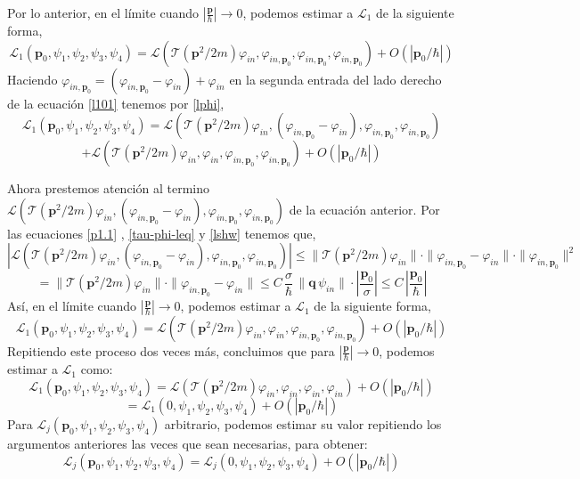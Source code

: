 \documentclass[12pt]{book}
\numberwithin{equation}{chapter}
\def\v{\mathbf}
\def\n{\noindent}
\def\T{\mathcal{T}}
\def\L{\mathcal{L}}
\def\vp{\varphi}
\def\P{\mathbf{p}}
\begin{document}
\n Por lo anterior, en el l\'imite cuando $\left| \frac{\P}{\hbar} \right| \rightarrow 0$, podemos estimar a $\L_{1}$ de la siguiente forma,
\begin{equation} \label{l101}
\L_{1}(\P_{0}, \psi_{1},\psi_{2},\psi_{3},\psi_{4})=
\L(\T (\P^{2}/2m) \vp_{in},\vp_{in,\P_{0}},\vp_{in,\P_{0}},\vp_{in,\P_{0}} )+ O \left( \left|\P_{0}/\hbar \right| \right)
\end{equation}
Haciendo $ \vp_{in,\P_{0}}= ( \vp_{in,\P_{0}} - \vp_{in} )+ \vp_{in} $ en la segunda entrada del lado derecho de la ecuaci\'on \eqref{l101} tenemos por \eqref{lphi},
$$\L_{1}(\P_{0}, \psi_{1},\psi_{2},\psi_{3},\psi_{4})= \L(\T (\P^{2}/2m) \vp_{in},( \vp_{in,\P_{0}} - \vp_{in} ),\vp_{in,\P_{0}},\vp_{in,\P_{0}} ) $$
\begin{equation}\label{ap1}
+ \L(\T (\P^{2}/2m) \vp_{in},\vp_{in},\vp_{in,\P_{0}},\vp_{in,\P_{0}} )+ O \left( \left|\P_{0}/\hbar \right| \right)
\end{equation}

\n Ahora prestemos atenci\'on al termino $ \L(\T (\P^{2}/2m) \vp_{in},( \vp_{in,\P_{0}} - \vp_{in} ),\vp_{in,\P_{0}},\vp_{in,\P_{0}} ) $ de la ecuaci\'on anterior. Por las ecuaciones \eqref{p1.1} , \eqref{tau-phi-leq} y \eqref{lshw} tenemos que,
$$ \left| \L(\T (\P^{2}/2m) \vp_{in},( \vp_{in,\P_{0}} - \vp_{in} ),\vp_{in,\P_{0}},\vp_{in,\P_{0}} ) \right| \leq \| \T (\P^{2}/2m) \vp_{in} \| \cdot \| \vp_{in,\P_{0}} - \vp_{in} \| \cdot \| \vp_{in,\P_{0}} \|^{2} $$
$$ = \| \T (\P^{2}/2m) \vp_{in} \| \cdot \| \vp_{in,\P_{0}} - \vp_{in} \| \leq C \, \frac{\sigma}{\hbar}\, \| \v{q} \, \psi_{in} \| \cdot \left|\frac{\P_{0}}{\sigma} \right| \leq C \, \left|\frac{\P_{0}}{\hbar} \right| $$
As\'i, en el l\'imite cuando $\left| \frac{\P}{\hbar} \right| \rightarrow 0$, podemos estimar a $\L_{1}$ de la siguiente forma,
\begin{equation}\label{ap2}
\L_{1}(\P_{0}, \psi_{1},\psi_{2},\psi_{3},\psi_{4})=
\L(\T (\P^{2}/2m) \vp_{in},\vp_{in},\vp_{in,\P_{0}},\vp_{in,\P_{0}} )+ O \left( \left|\P_{0}/\hbar \right| \right)
\end{equation}
Repitiendo este proceso dos veces m\'as, concluimos que para $\left| \frac{\P}{\hbar} \right| \rightarrow 0$, podemos estimar a $\L_{1}$ como:
$$\L_{1}(\P_{0}, \psi_{1},\psi_{2},\psi_{3},\psi_{4})=
\L(\T (\P^{2}/2m) \vp_{in},\vp_{in},\vp_{in},\vp_{in} )+ O \left( \left|\P_{0}/\hbar \right| \right) $$
\begin{equation}\label{ap3}
= \L_{1}(0, \psi_{1},\psi_{2},\psi_{3},\psi_{4})+O \left( \left|\P_{0}/\hbar \right| \right)
\end{equation}
Para $\L_{j}(\P_{0}, \psi_{1},\psi_{2},\psi_{3},\psi_{4})$ arbitrario, podemos estimar su valor repitiendo los argumentos anteriores las veces que sean necesarias, para obtener:
\begin{equation}\label{liest}
\L_{j}(\P_{0}, \psi_{1},\psi_{2},\psi_{3},\psi_{4}) = \L_{j}(0, \psi_{1},\psi_{2},\psi_{3},\psi_{4}) + O(|\P_{0}/\hbar|)
\end{equation}
\end{document}
